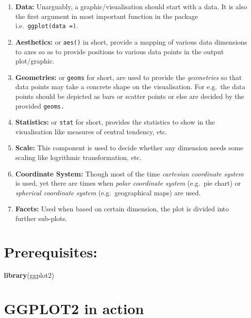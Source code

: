 \documentclass[
]{book}
\newenvironment{Shaded}{\begin{snugshade}}{\end{snugshade}}
\newcommand{\FunctionTok}[1]{\textcolor[rgb]{0.13,0.29,0.53}{\textbf{#1}}}
\newcommand{\NormalTok}[1]{#1}
\providecommand{\tightlist}{%
  \setlength{\itemsep}{0pt}\setlength{\parskip}{0pt}}
\begin{document}
\begin{enumerate}
\def\labelenumi{\arabic{enumi}.}
\tightlist
\item
  \textbf{Data:} Unarguably, a graphic/visualisation should start with a data. It is also the first argument in most important function in the package i.e.~\texttt{ggplot(data\ =)}.
\item
  \textbf{Aesthetics:} or \texttt{aes()} in short, provide a mapping of various data dimensions to axes so as to provide positions to various data points in the output plot/graphic.
\item
  \textbf{Geometries:} or \texttt{geoms} for short, are used to provide the \emph{geometries} so that data points may take a concrete shape on the visualisation. For e.g.~the data points should be depicted as bars or scatter points or else are decided by the provided \texttt{geoms.}
\item
  \textbf{Statistics:} or \texttt{stat} for short, provides the statistics to show in the visualisation like measures of central tendency, etc.
\item
  \textbf{Scale:} This component is used to decide whether any dimension needs some scaling like logrithmic transformation, etc.
\item
  \textbf{Coordinate System:} Though most of the time \emph{cartesian coordinate system} is used, yet there are times when \emph{polar coordinate system} (e.g.~pie chart) or \emph{spherical coordinate system} (e.g.~geographical maps) are used.
\item
  \textbf{Facets:} Used when based on certain dimension, the plot is divided into further sub-plots.
\end{enumerate}

\hypertarget{prerequisites}{%
\section{Prerequisites:}\label{prerequisites}}

\begin{Shaded}
\begin{Highlighting}[]
\FunctionTok{library}\NormalTok{(ggplot2)}
\end{Highlighting}
\end{Shaded}

\hypertarget{ggplot2-in-action}{%
\section{GGPLOT2 in action}\label{ggplot2-in-action}}
\end{document}
